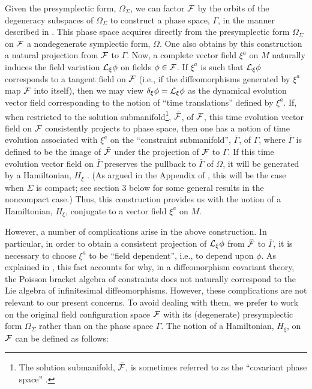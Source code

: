 Given the presymplectic form, $\Omega_\Sigma$, we can factor ${\cal
F}$ by the orbits of the degeneracy subspaces of $\Omega_\Sigma$ to
construct a phase space, $\Gamma$, in the manner described in
\cite{lw}. This phase space acquires directly from the presymplectic
form $\Omega_\Sigma$ on ${\cal F}$ a nondegenerate symplectic form,
$\Omega$. One also obtains by this construction a natural projection
from ${\cal F}$ to $\Gamma$. Now, a complete vector field $\xi^a$ on
$M$ naturally induces the field variation ${\cal L}_\xi \phi$ on
fields $\phi \in {\cal F}$. If $\xi^a$ is such that ${\cal L}_\xi
\phi$ corresponds to a tangent field on ${\cal F}$ (i.e., if the
diffeomorphisms generated by $\xi^a$ map $\cal F$ into itself), then
we may view $\delta_\xi \phi = {\cal L}_\xi \phi$ as the dynamical
evolution vector field corresponding to the notion of ``time
translations'' defined by $\xi^a$. If, when restricted to the solution
submanifold\footnote{The solution submanifold, $\bar{{\cal F}}$, is
sometimes referred to as the ``covariant phase space'' \cite{abr}.},
$\bar{{\cal F}}$, of ${\cal F}$, this time evolution vector field on
${\cal F}$ consistently projects to phase space, then one has a notion
of time evolution associated with $\xi^a$ on the ``constraint
submanifold'', $\bar{\Gamma}$, of $\Gamma$, where $\bar{\Gamma}$ is
defined to be the image of $\bar{{\cal F}}$ under the projection of
${\cal F}$ to $\Gamma$. If this time evolution vector field on
$\bar{\Gamma}$ preserves the pullback to $\bar{\Gamma}$ of $\Omega$,
it will be generated by a Hamiltonian, $H_\xi$ \cite{lw}. (As argued
in the Appendix of \cite{lw}, this will be the case when $\Sigma$ is
compact; see section 3 below for some general results in the
noncompact case.)  Thus, this construction provides us with the notion
of a Hamiltonian, $H_\xi$, conjugate to a vector field $\xi^a$ on $M$.

However, a number of complications arise in the above
construction. In particular, in order to obtain a consistent
projection of ${\cal L}_\xi \phi$ from $\bar{{\cal F}}$ to
$\bar{\Gamma}$, it is necessary to choose $\xi^a$ to be ``field
dependent'', i.e., to depend upon $\phi$. As explained in \cite{lw},
this fact accounts for why, in a diffeomorphism covariant theory, the
Poisson bracket algebra of constraints does not naturally correspond
to the Lie algebra of infinitesimal diffeomorphisms. However, these
complications are not relevant to our present concerns. To avoid
dealing with them, we prefer to work on the original field
configuration space ${\cal F}$ with its (degenerate) presymplectic
form $\Omega_\Sigma$ rather than on the phase space $\Gamma$. The notion of a
Hamiltonian, $H_\xi$, on ${\cal F}$ can be defined as follows:

